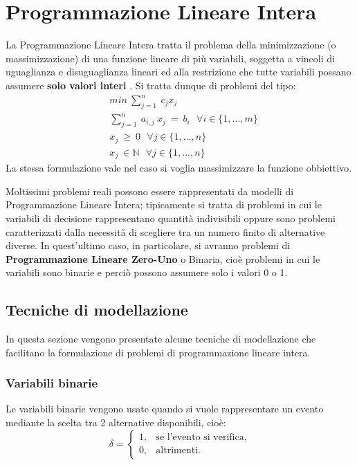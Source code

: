 \section{Programmazione Lineare Intera}
La Programmazione Lineare Intera tratta il problema della minimizzazione (o massimizzazione) di una funzione lineare di più variabili, soggetta a vincoli di uguaglianza e disuguaglianza lineari ed alla restrizione che tutte variabili possano assumere \textbf{solo valori interi} \cite{ref:IntroLinearOptimization}. Si tratta dunque di problemi del tipo:
\begin{equation}
\begin{split}
& min ~ \sum_{j=1}^n ~ c_j x_j \\
& \sum_{j=1}^n ~ a_{i, j} ~ x_j ~ = ~ b_i ~~~ \forall i \in \{1,...,m\} \\
& x_j ~ \geq ~ 0 ~~~ \forall j \in \{1,...,n\} \\
& x_j ~ \in \mathbb{N} ~~~ \forall j \in \{1,...,n\}
\end{split}
\end{equation}
La stessa formulazione vale nel caso si voglia massimizzare la funzione obbiettivo.

Moltissimi problemi reali possono essere rappresentati da modelli di Programmazione Lineare Intera; tipicamente si tratta di problemi in cui le variabili di decisione rappresentano quantità indivisibili oppure sono problemi caratterizzati dalla necessità di scegliere tra un numero finito di alternative diverse. In quest'ultimo caso, in particolare, si avranno problemi di \textbf{Programmazione Lineare Zero-Uno} o Binaria, cioè problemi in cui le variabili sono binarie e perciò possono assumere solo i valori 0 o 1.


\subsection{Tecniche di modellazione}
In questa sezione vengono presentate alcune tecniche di modellazione che facilitano la formulazione di problemi di programmazione lineare intera.

\subsubsection*{Variabili binarie}
Le variabili binarie vengono usate quando si vuole rappresentare un evento mediante la scelta tra 2 alternative disponibili, cioè:
\begin{equation}
\label{eq:varBinarie}
\delta=
\begin{cases}
1, & \text{se l'evento si verifica,} \\
0, & \text{altrimenti.}
\end{cases}
\end{equation}


